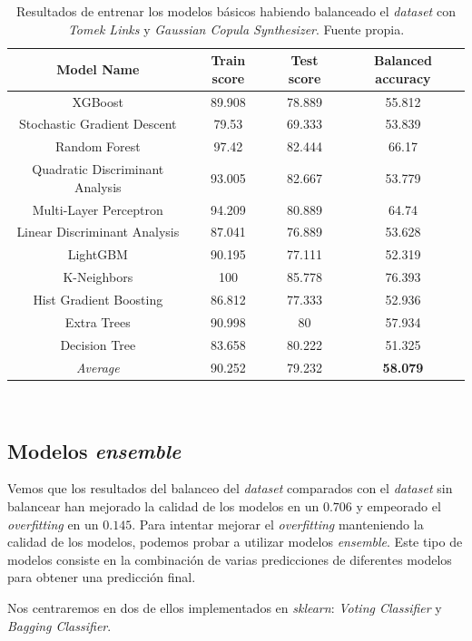 \begin{table}[!h]
    \centering
    \begin{tabular}{|c|ccc|}\hline
        Model Name & Train score & Test score & Balanced accuracy \\ \hline
        XGBoost & 89.908 & 78.889 & 55.812 \\ 
        Stochastic Gradient Descent & 79.53 & 69.333 & 53.839 \\ 
        Random Forest & 97.42 & 82.444 & 66.17 \\ 
        Quadratic Discriminant Analysis & 93.005 & 82.667 & 53.779 \\ 
        Multi-Layer Perceptron & 94.209 & 80.889 & 64.74 \\ 
        Linear Discriminant Analysis & 87.041 & 76.889 & 53.628 \\ 
        LightGBM & 90.195 & 77.111 & 52.319 \\ 
        K-Neighbors & 100 & 85.778 & 76.393 \\ 
        Hist Gradient Boosting & 86.812 & 77.333 & 52.936 \\ 
        Extra Trees & 90.998 & 80 & 57.934 \\ 
        Decision Tree & 83.658 & 80.222 & 51.325 \\ \hline
        \textit{Average} & 90.252 & 79.232 & \textbf{58.079} \\ \hline
    \end{tabular}
    \caption{Resultados de entrenar los modelos básicos habiendo balanceado el \textit{dataset} con \textit{Tomek Links} y \textit{Gaussian Copula Synthesizer}. Fuente propia.}\ \label{tab:balanced-basic-training}
\end{table}

\subsection{Modelos \textit{ensemble}}

Vemos que los resultados del balanceo del \textit{dataset} comparados con el \textit{dataset} sin balancear han mejorado la calidad de los modelos en un $0.706$ y empeorado el \textit{overfitting} en un $0.145$. Para intentar mejorar el \textit{overfitting} manteniendo la calidad de los modelos, podemos probar a utilizar modelos \textit{ensemble}. Este tipo de modelos consiste en la combinación de varias predicciones de diferentes modelos para obtener una predicción final. 

Nos centraremos en dos de ellos implementados en \textit{sklearn}: \textit{Voting Classifier} y \textit{Bagging Classifier}. 

